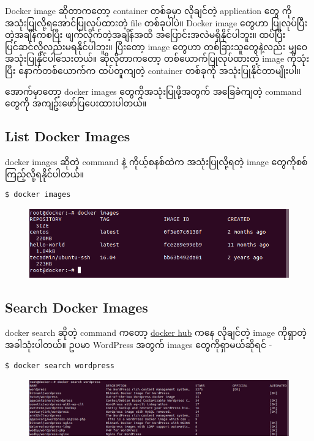 \documentclass{article}
\begin{document}
Docker image ဆိုတာကတော့ container တစ်ခုမှာ လိုချင်တဲ့ application တွေ
ကိုအသုံးပြုလို့ရအောင်ပြုလုပ်ထားတဲ့ file တစ်ခုပါပဲ။ Docker image တွေဟာ
ပြုလုပ်ပြီးတဲ့အချိန်ကစပြီး ဖျက်လိုက်တဲ့အချိန်အထိ
အပြောင်းအလဲမရှိနိုင်ပါဘူး။ ထပ်ပြီးပြင်ဆင်လို့လည်းမရနိုင်ပါဘူး။ ပြီးတော့
image တွေဟာ တစ်ခြားသူတွေနဲ့လည်း မျှဝေအသုံးပြုနိုင်ပါသေးတယ်။
ဆိုလိုတာကတော့ တစ်ယောက်ပြုလုပ်ထားတဲ့ image ကိုသုံးပြီး နောက်တစ်ယောက်က
ထပ်တူကျတဲ့ container တစ်ခုကို အသုံးပြုနိုင်တာမျိုးပါ။

အောက်မှာတော့ docker images တွေကိုအသုံးပြုဖို့အတွက် အခြေခံကျတဲ့ command
တွေကို အကျဥ်းဖော်ပြပေးထားပါတယ်။

\subsection{List Docker Images}\label{list-docker-images}

docker images ဆိုတဲ့ command နဲ့ ကိုယ့်စနစ်ထဲက အသုံးပြုလို့ရတဲ့ image
တွေကိုစစ်ကြည့်လို့ရနိုင်ပါတယ်။

\begin{verbatim}
$ docker images
\end{verbatim}

\begin{figure}[htbp]
\centering
\includegraphics[width=0.70\paperwidth]{.gitbook/assets/1_ls.png}
\end{figure}

\subsection{Search Docker Images}\label{search-docker-images}

docker search ဆိုတဲ့ command ကတော့ \href{https://hub.docker.com/}{docker
hub} ကနေ လိုချင်တဲ့ image ကိုရှာတဲ့အခါသုံးပါတယ်။ ဥပမာ WordPress အတွက်
images တွေကိုရှာမယ်ဆိုရင် -

\begin{verbatim}
$ docker search wordpress
\end{verbatim}

\begin{figure}[htbp]
\centering
\includegraphics[width=0.70\paperwidth]{.gitbook/assets/2_search-large-resolution.png}
\end{figure}
\end{document}
